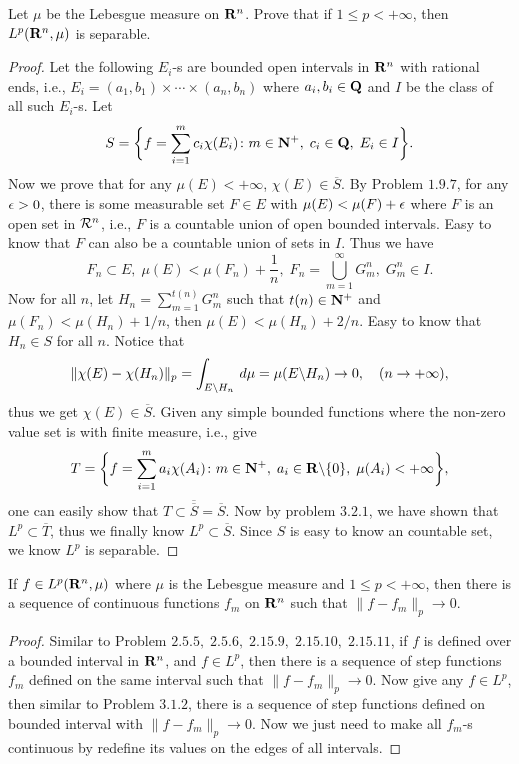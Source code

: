 \begin{pro}%
	Let $\mu$ be the Lebesgue measure on $\mathbf{R}^n$. Prove that if $1\leq p<+\infty$, then $L^p(\mathbf{R}^n,\mu)$ is separable.
\end{pro}
\begin{proof}
	Let the following $E_i$-s are bounded open intervals in $\mathbf{R}^n$ with rational ends, i.e., $E_i=(a_1,b_1)\times\cdots\times(a_n,b_n)$ where $a_i,b_i\in \mathbf{Q}$ and $I$ be the class of all such $E_i$-s. Let 
	\[S=\bigg\{f=\sum_{i=1}^m c_i\chi(E_i)\colon m\in\mathbf{N}^+,\;c_i\in\mathbf{Q},\;E_i\in I\bigg\}.\]
	Now we prove that for any $\mu(E)<+\infty$, $\chi(E)\in\overline{S}$. By Problem $1.9.7$, for any $\epsilon>0$, there is some measurable set $F\in E$ with $\mu(E)<\mu(F)+\epsilon$ where $F$ is an open set in $\mathcal{R}^n$, i.e., $F$ is a countable union of open bounded intervals. Easy to know that $F$ can also be a countable union of sets in $I$. Thus we have
	\[F_n\subset E,\;\mu(E)<\mu(F_n)+\frac{1}{n},\;F_n=\bigcup_{m=1}^{\infty}G_m^n,\;G_m^n\in I.\]
	Now for all $n$, let $H_n=\sum_{m=1}^{t(n)} G_m^n$ such that $t(n)\in\mathbf{N}^+$ and $\mu(F_n)<\mu(H_n)+1/n$, then $\mu(E)<\mu(H_n)+2/n$. Easy to know that $H_n\in S$ for all $n$. Notice that
	\[\|\chi(E)-\chi(H_n)\|_p=\int_{E\backslash H_n}\,d\mu=\mu(E\backslash H_n)\to 0,\quad (n\to+\infty),\]
	thus we get $\chi(E)\in\overline{S}$. Given any simple bounded functions where the non-zero value set is with finite measure, i.e., give
	\[T=\bigg\{f=\sum_{i=1}^m a_i\chi(A_i)\colon m\in\mathbf{N}^+,\;a_i\in\mathbf{R}\backslash\{0\},
	\;\mu(A_i)<+\infty\bigg\},\]
	one can easily show that $T\subset\overline{\overline{S}}=\overline{S}$. Now by problem $3.2.1$, we have shown that 
	$L^p\subset \overline{T}$, thus we finally know $L^p\subset \overline{S}$. Since $S$ is easy to know an countable set, we know $L^p$ is separable.
\end{proof}

\begin{pro}%
	If $f\in L^p(\mathbf{R}^n,\mu)$ where $\mu$ is the Lebesgue measure and $1\leq p<+\infty$, then there is a sequence of continuous functions $f_m$ on $\mathbf{R}^n$ such that $\|f-f_m\|_p\to 0$.
\end{pro}
\begin{proof}
	Similar to Problem $2.5.5,\;2.5.6,\;2.15.9,\;2.15.10,\;2.15.11$, if $f$ is defined over a bounded interval in $\mathbf{R}^n$, and $f\in L^p$, then there is a sequence of step functions $f_m$ defined on the same interval such that $\|f-f_m\|_p\to 0$. Now give any $f\in L^p$, then similar to Problem $3.1.2$, there is a sequence of step functions defined on bounded interval with $\|f-f_m\|_p\to 0$. Now we just need to make all $f_m$-s continuous by redefine its values on the edges of all intervals.
\end{proof}

